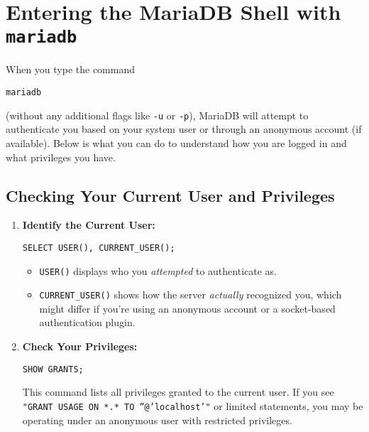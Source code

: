 \documentclass[10pt]{article}
\begin{document}
\section{Entering the MariaDB Shell with \texttt{mariadb}}
When you type the command
\begin{verbatim}
mariadb
\end{verbatim}
(without any additional flags like \texttt{-u} or \texttt{-p}), MariaDB will attempt to authenticate you based on your system user or through an anonymous account (if available). Below is what you can do to understand how you are logged in and what privileges you have.

\subsection{Checking Your Current User and Privileges}
\begin{enumerate}
  \item \textbf{Identify the Current User:}
  \begin{verbatim}
SELECT USER(), CURRENT_USER();
  \end{verbatim}
  \begin{itemize}
    \item \texttt{USER()} displays who you \emph{attempted} to authenticate as.
    \item \texttt{CURRENT\_USER()} shows how the server \emph{actually} recognized you, which might differ if you’re using an anonymous account or a socket-based authentication plugin.
  \end{itemize}

  \item \textbf{Check Your Privileges:}
  \begin{verbatim}
SHOW GRANTS;
  \end{verbatim}
  This command lists all privileges granted to the current user. If you see \texttt{"GRANT USAGE ON *.* TO ''@'localhost'"} or limited statements, you may be operating under an anonymous user with restricted privileges.
\end{enumerate}
\end{document}
